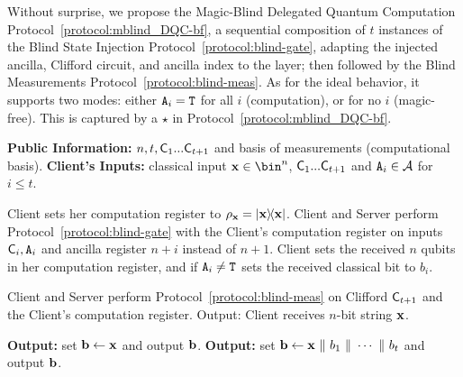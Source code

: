 Without surprise, we propose the Magic-Blind Delegated Quantum Computation Protocol~\ref{protocol:mblind_DQC-bf}, a sequential composition of $t$ instances of the Blind State Injection Protocol~\ref{protocol:blind-gate}, adapting the injected ancilla, Clifford circuit, and ancilla index to the layer; then followed by the Blind Measurements Protocol~\ref{protocol:blind-meas}. As for the ideal behavior, it supports two modes: either $\mathtt{A}_i=\mathtt{T}$ for all $i$ (computation), or for no $i$ (magic-free). This is captured by a $\star$ in Protocol~\ref{protocol:mblind_DQC-bf}.
\begin{protocoll}
    \caption{Magic-Blind Delegated Quantum Computation (MB-DQC)}
    \label{protocol:mblind_DQC-bf}
    \begin{algorithmic}[1]
        \State \textbf{Public Information:} $n, t, \mathsf{C}_1...\mathsf{C}_{t+1}$ and basis of measurements (computational basis).
        \State \textbf{Client's Inputs:} classical input $\x\in\bin^n$, $\mathsf{C}_1...\mathsf{C}_{t+1}$ and $\mathtt{A}_i\in\mathcal A$ for $i\leq t$.

        \State Client sets her computation register to $\rho_\x = \ketbra \x$.
                \State Client and Server perform Protocol~\ref{protocol:blind-gate} with the Client's computation register on inputs $\mathsf{C}_i, \mathtt{A}_i$ and ancilla register $n+i$ instead of $n+1$.
                \State
                Client sets the received $n$
                 qubits in her computation register, and if $\mathtt{A}_i\neq\mathtt{T}$ sets the received classical bit to $b_i$.
            \EndFor
        \EndProcedure

            \State Client and Server perform Protocol~\ref{protocol:blind-meas} on Clifford $\mathsf{C}_{t+1}$ and the Client's computation register.
            \State Output: Client receives $n$-bit string $\mathbf x$.
        \EndProcedure

        \If{$\star$}
        \State \textbf{Output:} set $\mathbf b\gets \mathbf x$ and output $\mathbf b$.
    \Else
        \State \textbf{Output:} set $\b\gets \x\ \|\ b_1\ \|\ \cdots\ \|\ b_t$ and output $\mathbf b$.
    \EndIf
        \EndProcedure
    \end{algorithmic}
\end{protocoll}

